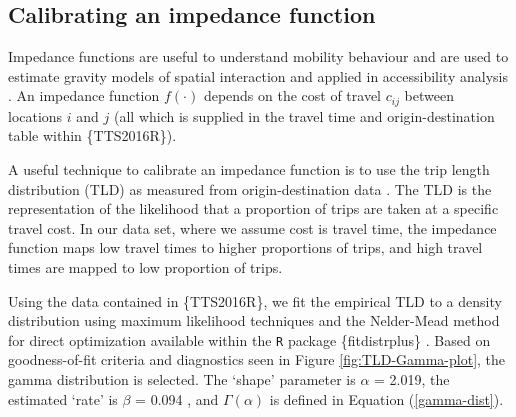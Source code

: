 \documentclass[Royal,times,sageh]{sagej}
\begin{document}
\hypertarget{calibrating-an-impedance-function}{%
\subsection{Calibrating an impedance
function}\label{calibrating-an-impedance-function}}

Impedance functions are useful to understand mobility behaviour and are
used to estimate gravity models of spatial interaction
\citep{wilson1971, haynes_gravity_1985} and applied in accessibility
analysis
\citep{hansen_how_1959, paez_jobs_2013, barboza_balancing_2021}. An
impedance function \(f(\cdot)\) depends on the cost of travel \(c_{ij}\)
between locations \(i\) and \(j\) (all which is supplied in the travel
time and origin-destination table within \{TTS2016R\}).

A useful technique to calibrate an impedance function is to use the trip
length distribution (TLD) as measured from origin-destination data
\citep{horbachov_theoretical_2018, batista_estimation_2019}. The TLD is
the representation of the likelihood that a proportion of trips are
taken at a specific travel cost. In our data set, where we assume cost
is travel time, the impedance function maps low travel times to higher
proportions of trips, and high travel times are mapped to low proportion
of trips.

Using the data contained in \{TTS2016R\}, we fit the empirical TLD to a
density distribution using maximum likelihood techniques and the
Nelder-Mead method for direct optimization available within the
\texttt{R} package \{fitdistrplus\} \citep{fitdistrplus_2015}. Based on
goodness-of-fit criteria and diagnostics seen in Figure
\ref{fig:TLD-Gamma-plot}, the gamma distribution is selected. The
`shape' parameter is \(\alpha\) = 2.019, the estimated `rate' is
\(\beta\) = 0.094 , and \(\Gamma(\alpha)\) is defined in Equation
(\ref{gamma-dist}).
\end{document}
